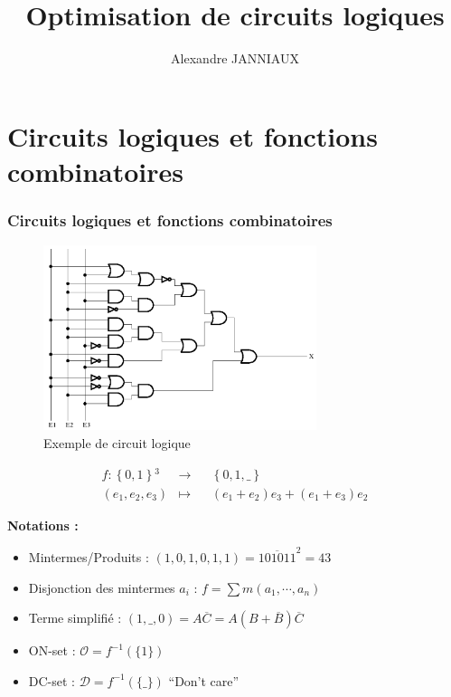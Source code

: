 \documentclass[handout]{beamer}
\title{Optimisation de circuits logiques}
\author{Alexandre JANNIAUX}
\date{}
\newcommand{\ensemble}[1]{\left\lbrace{} #1 \right\rbrace{}}
\begin{document}
\begin{frame}
  \maketitle
  \tableofcontents
\end{frame}

\section{Circuits logiques et fonctions combinatoires}
\begin{frame}
  \frametitle{Circuits logiques et fonctions combinatoires}
  \begin{figure}[p]
    \includegraphics[width=8cm]{circuit_logique.png}
    \caption{Exemple de circuit logique}
    \label{fig:circ1}
  \end{figure}
  
  \[ \begin{aligned}
    f: \ensemble{0,1}^3 &\longrightarrow && \ensemble{0,1,\_} \\
    (e_1,e_2,e_3) & \longmapsto && (e_1+e_2)e_3 + (e_1+e_3)e_2
  \end{aligned}
  \]

  \textbf{Notations : }
  \begin{itemize}
  \item Mintermes/Produits : $(1,0,1,0,1,1) = \overline{101011}^{2} = 43$
  \item Disjonction des mintermes $a_i$ : $f = \sum m(a_1, \cdots, a_n)$
  \item Terme simplifié : $(1,\_,0) = A\overline{C} = A(B+\overline{B})\overline{C}$
  \item ON-set : $\mathcal{O} = f^{-1}(\{1\})$
  \item DC-set : $\mathcal{D} = f^{-1}(\{\_\})$ ``Don't care''
  \end{itemize}
  



  
  \begin{figure}[p]
%    
  \end{figure}
  

  
\end{frame}
\end{document}
